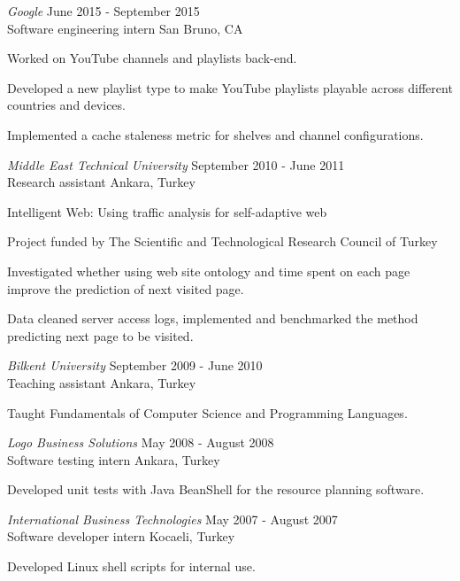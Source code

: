 {\textit{Google} \hfill{June 2015 - September 2015}\\
Software engineering intern \hfill{San Bruno, CA}
\begin{myitemize}
\item Worked on YouTube channels and playlists back-end.
\item Developed a new playlist type to make YouTube playlists playable across different countries and devices.
\item Implemented a cache staleness metric for shelves and channel configurations.
\end{myitemize}

\textit{Middle East Technical University} \hfill{September 2010 - June 2011}\\
Research assistant \hfill{Ankara, Turkey}
\begin{myitemize}
\item Intelligent Web: Using traffic analysis for self-adaptive web
\item Project funded by The Scientific and Technological Research Council of Turkey
\item Investigated whether using web site ontology and time spent on each page
  improve the prediction of next visited page.
\item Data cleaned server access logs, implemented and benchmarked the method
  predicting next page to be visited.
\end{myitemize}

\textit{Bilkent University} \hfill{September 2009 - June 2010}\\
Teaching assistant \hfill{Ankara, Turkey}
\begin{myitemize}
\item Taught Fundamentals of Computer Science and Programming Languages.
\end{myitemize}

\textit{Logo Business Solutions} \hfill{May 2008 - August 2008}\\
Software testing intern \hfill{Ankara, Turkey}
\begin{myitemize}
\item Developed unit tests with Java BeanShell for the resource planning software.
\end{myitemize}

\textit{International Business Technologies} \hfill{May 2007 - August 2007}\\
Software developer intern \hfill{Kocaeli, Turkey}
\begin{myitemize}
\item Developed Linux shell scripts for internal use.
\end{myitemize}

}

